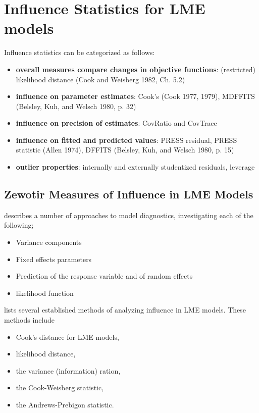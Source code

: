 \documentclass[12pt, a4paper]{report}
\theoremstyle{plain}
\theoremstyle{definition}
\theoremstyle{remark}
\begin{document}
	\section{Influence Statistics for LME models} %
	Influence statistics can be categorized as follows:
	\begin{itemize}
		\item \textbf{overall measures compare changes in objective functions}: (restricted) likelihood distance (Cook and Weisberg 1982, Ch. 5.2)
		\item \textbf{influence on parameter estimates}: Cook's  (Cook 1977, 1979), MDFFITS (Belsley, Kuh, and Welsch 1980, p. 32)
		\item \textbf{influence on precision of estimates}: CovRatio and CovTrace
		\item \textbf{influence on fitted and predicted values}: PRESS residual, PRESS statistic (Allen 1974), DFFITS (Belsley, Kuh, and Welsch 1980, p. 15)
		\item \textbf{outlier properties}: internally and externally studentized residuals, leverage
	\end{itemize}
	
	

	\subsection{Zewotir Measures of Influence in LME Models}%
	\citet{Zewotir} describes a number of approaches to model diagnostics, investigating each of the following;
	\begin{itemize}
		\item Variance components
		\item Fixed effects parameters
		\item Prediction of the response variable and of random effects
		\item likelihood function
	\end{itemize}
	
	
	
	\citet{Zewotir} lists several established methods of analyzing influence in LME models. These methods include \begin{itemize}
		\item Cook's distance for LME models,
		\item {} likelihood distance,
		\item the variance (information) ration,
		\item the  Cook-Weisberg statistic,
		\item the  Andrews-Prebigon statistic.
	\end{itemize}
	
\end{document}
